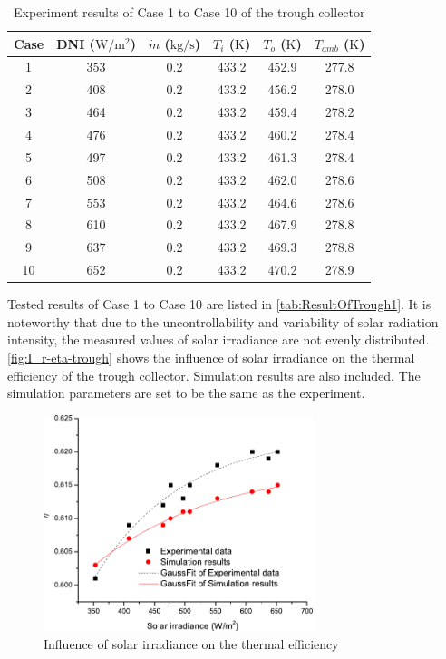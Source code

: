 \begin{table}[htbp]\footnotesize
	\caption{Experiment results of Case 1 to Case 10 of the trough collector}
	\centering
	\begin{tabular}{cccccc}
		\toprule
		Case	& DNI ($\mathrm{W/m^2}$)	&	$\dot{m}$ ($\mathrm{kg/s}$)			&	$T_i$ ($\mathrm{K}$)	&	$T_o$ ($\mathrm{K}$)		&	$T_{amb}$ ($\mathrm{K}$)\\
		\midrule
		1	&	353	&	0.2	&	433.2	&	452.9	&	277.8\\
		2	&	408	&	0.2	&	433.2	&	456.2	&	278.0\\
		3	&	464	&	0.2	&	433.2	&	459.4	&	278.2\\
		4	&	476	&	0.2	&	433.2	&	460.2	&	278.4\\
		5	&	497	&	0.2	&	433.2	&	461.3	&	278.4\\
		6	&	508	&	0.2	&	433.2	&	462.0	&	278.6\\
		7	&	553	&	0.2	&	433.2	&	464.6	&	278.6\\
		8	&	610	&	0.2	&	433.2	&	467.9	&	278.8\\
		9	&	637	&	0.2	&	433.2	&	469.3	&	278.8\\
		10	&	652	&	0.2	&	433.2	&	470.2	&	278.9\\
		\bottomrule
	\end{tabular}
	
	\label{tab:ResultOfTrough1}
\end{table}
Tested results of Case 1 to Case 10 are listed in \autoref{tab:ResultOfTrough1}. It is noteworthy that due to the uncontrollability and variability of solar radiation intensity, the measured values of solar irradiance are not evenly distributed.
\autoref{fig:I_r-eta-trough} shows the influence of solar irradiance on the thermal efficiency of the trough collector. Simulation results are also included. The simulation parameters are set to be the same as the experiment. 
\begin{figure}[!ht]
\centering
\includegraphics[width=0.7\textwidth]{fig/I_r-eta-trough}
\caption{Influence of solar irradiance on the thermal efficiency}
\label{fig:I_r-eta-trough}
\end{figure}

